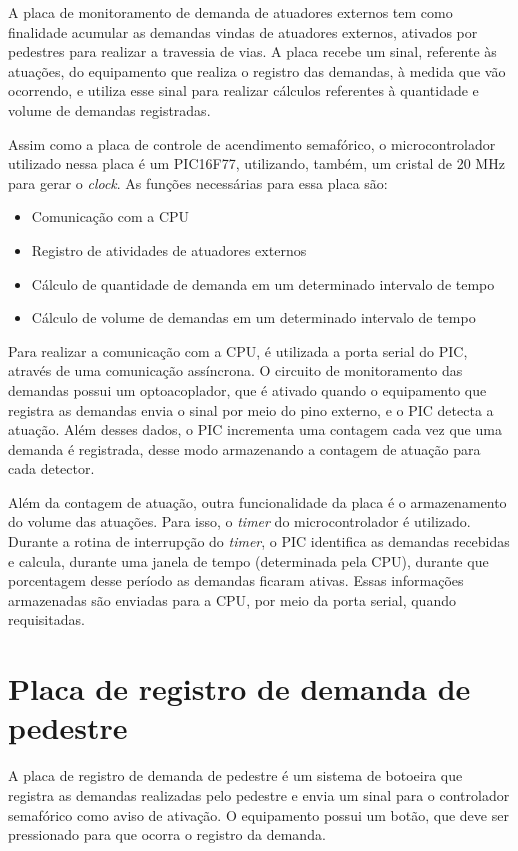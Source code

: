 A placa de monitoramento de demanda de atuadores externos tem como finalidade acumular as demandas vindas de atuadores externos, ativados por pedestres para realizar a travessia de vias. A placa recebe um sinal, referente às atuações, do equipamento que realiza o registro das demandas, à medida que vão ocorrendo, e utiliza esse sinal para realizar cálculos referentes à quantidade e volume de demandas registradas.

Assim como a placa de controle de acendimento semafórico, o microcontrolador utilizado nessa placa é um PIC16F77, utilizando, também, um cristal de 20 MHz para gerar o \textit{clock}. As funções necessárias para essa placa são:

\begin{itemize}
\item Comunicação com a \ac{CPU}
\item Registro de atividades de atuadores externos
\item Cálculo de quantidade de demanda em um determinado intervalo de tempo
\item Cálculo de volume de demandas em um determinado intervalo de tempo
\end{itemize}

Para realizar a comunicação com a \ac{CPU}, é utilizada a porta serial do PIC, através de uma comunicação assíncrona. 
O circuito de monitoramento das demandas possui um optoacoplador, que é ativado quando o equipamento que registra as demandas envia o sinal por meio do pino externo, e o PIC detecta a atuação. Além desses dados, o PIC incrementa uma contagem cada vez que uma demanda é registrada, desse modo armazenando a contagem de atuação para cada detector.

Além da contagem de atuação, outra funcionalidade da placa é o armazenamento do volume das atuações. Para isso, o \textit{timer} do microcontrolador é utilizado. Durante a rotina de interrupção do \textit{timer}, o PIC identifica as demandas recebidas e calcula, durante uma janela de tempo (determinada pela \ac{CPU}), durante que porcentagem desse período as demandas ficaram ativas. Essas informações armazenadas são enviadas para a \ac{CPU}, por meio da porta serial, quando requisitadas.

\section{Placa de registro de demanda de pedestre}

A placa de registro de demanda de pedestre é um sistema de botoeira que registra as demandas realizadas pelo pedestre e envia um sinal para o controlador semafórico como aviso de ativação. O equipamento possui um botão, que deve ser pressionado para que ocorra o registro da demanda. 

